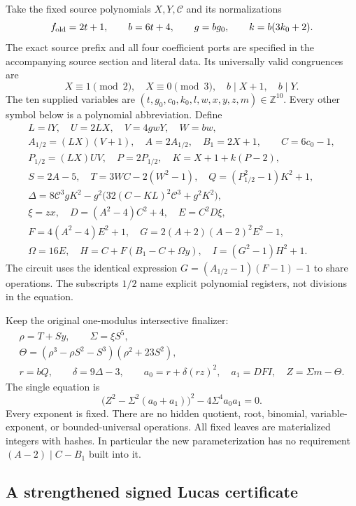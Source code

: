 Take the fixed source polynomials $X,Y,\mathcal C$ and its normalizations
\[
 f_{\rm old}=2t+1,\qquad b=6t+4,\qquad
 g=bg_0,\qquad k=b(3k_0+2).
\]
The exact source prefix and all four coefficient ports are specified in the
accompanying source section and literal data. Its universally valid
congruences are
\[
 X\equiv1\pmod2,\quad X\equiv0\pmod3,\quad
 b\mid X+1,\quad b\mid Y.
\]
The ten supplied variables are
$(t,g_0,c_0,k_0,l,w,x,y,z,m)\in\mathbb Z^{10}$. Every other symbol below
is a polynomial abbreviation. Define
\begin{gather*}
 L=lY,\quad U=2LX,\quad V=4gwY,\quad W=bw,\\
 A_{1/2}=(LX)(V+1),\quad A=2A_{1/2},\quad B_1=2X+1,
 \qquad \boxed{C=6c_0-1},\\
 P_{1/2}=(LX)UV,\quad P=2P_{1/2},\quad
 K=X+1+k(P-2),\\
 S=2A-5,\quad T=3WC-2(W^2-1),\quad
 Q=(P_{1/2}^2-1)K^2+1,\\
 \Delta=8\mathcal C^3gK^2-g^2
       \bigl(32(C-KL)^2\mathcal C^3+g^2K^2\bigr),\\
 \xi=zx,\quad D=(A^2-4)C^2+4,\quad E=C^2D\xi,\\
 F=4(A^2-4)E^2+1,\quad
 G=2(A+2)(A-2)^2E^2-1,\\
 \Omega=16E,\quad H=C+F(B_1-C+\Omega y),\quad
 I=(G^2-1)H^2+1.
\end{gather*}
The circuit uses the identical expression
$G=(A_{1/2}-1)(F-1)-1$ to share operations. The subscripts $1/2$ name
explicit polynomial registers, not divisions in the equation.

Keep the original one-modulus intersective finalizer:
\begin{gather*}
 \rho=T+Sy,\qquad \Sigma=\xi S^5,\\
 \Theta=(\rho^3-\rho S^2-S^3)(\rho^2+23S^2),\\
 r=bQ,\qquad \delta=9\Delta-3,\qquad
 a_0=r+\delta(rz)^2,\quad a_1=DFI,\quad Z=\Sigma m-\Theta.
\end{gather*}
The single equation is
\begin{equation}\label{eq:free-C-final}
 \boxed{\bigl(Z^2-\Sigma^2(a_0+a_1)\bigr)^2
             -4\Sigma^4a_0a_1=0.}
\end{equation}
Every exponent is fixed. There are no hidden quotient, root, binomial,
variable-exponent, or bounded-universal operations. All fixed leaves are
materialized integers with hashes. In particular the new parameterization
has no requirement $(A-2)\mid C-B_1$ built into it.

\subsection{A strengthened signed Lucas certificate}

